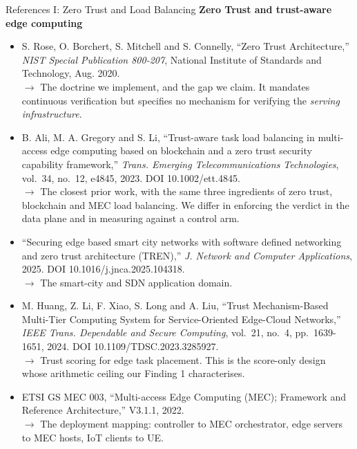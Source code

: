 \documentclass[aspectratio=169, 11pt]{beamer}
\begin{document}
\begin{frame}[allowframebreaks]{References I: Zero Trust and Load Balancing}
    \textbf{Zero Trust and trust-aware edge computing}
    \begin{itemize}\itemsep1.5pt
        \item[{[1]}] S. Rose, O. Borchert, S. Mitchell and S. Connelly, ``Zero Trust Architecture,'' \emph{NIST Special Publication 800-207}, National Institute of Standards and Technology, Aug. 2020.\\
          {\color{gray}$\rightarrow$ The doctrine we implement, and the gap we claim. It mandates continuous verification but specifies no mechanism for verifying the \emph{serving infrastructure}.}
        \item[{[11]}] B. Ali, M. A. Gregory and S. Li, ``Trust-aware task load balancing in multi-access edge computing based on blockchain and a zero trust security capability framework,'' \emph{Trans. Emerging Telecommunications Technologies}, vol.~34, no.~12, e4845, 2023. DOI 10.1002/ett.4845.\\
          {\color{gray}$\rightarrow$ The closest prior work, with the same three ingredients of zero trust, blockchain and MEC load balancing. We differ in enforcing the verdict in the data plane and in measuring against a control arm.}
        \item[{[12]}] ``Securing edge based smart city networks with software defined networking and zero trust architecture (TREN),'' \emph{J. Network and Computer Applications}, 2025. DOI 10.1016/j.jnca.2025.104318.\\
          {\color{gray}$\rightarrow$ The smart-city and SDN application domain.}
        \item[{[13]}] M. Huang, Z. Li, F. Xiao, S. Long and A. Liu, ``Trust Mechanism-Based Multi-Tier Computing System for Service-Oriented Edge-Cloud Networks,'' \emph{IEEE Trans. Dependable and Secure Computing}, vol.~21, no.~4, pp.~1639-1651, 2024. DOI 10.1109/TDSC.2023.3285927.\\
          {\color{gray}$\rightarrow$ Trust scoring for edge task placement. This is the score-only design whose arithmetic ceiling our Finding 1 characterises.}
        \item[{[19]}] ETSI GS MEC 003, ``Multi-access Edge Computing (MEC); Framework and Reference Architecture,'' V3.1.1, 2022.\\
          {\color{gray}$\rightarrow$ The deployment mapping: controller to MEC orchestrator, edge servers to MEC hosts, IoT clients to UE.}
    \end{itemize}


\end{frame}
\end{document}
